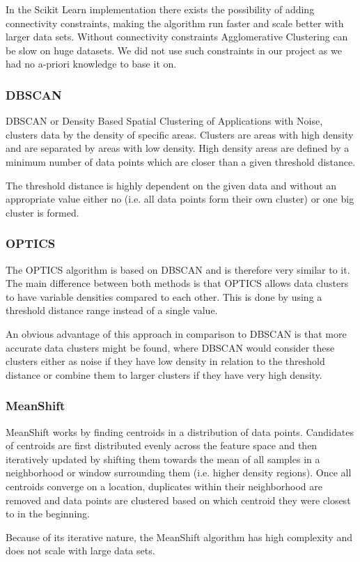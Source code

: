 In the Scikit Learn implementation there exists the possibility of adding connectivity constraints, making the algorithm run faster and scale better with larger data sets. Without connectivity constraints Agglomerative Clustering can be slow on huge datasets. We did not use such constraints in our project as we had no a-priori knowledge to base it on.

\subsubsection{DBSCAN}
DBSCAN or Density Based Spatial Clustering of Applications with Noise, clusters data by the density of specific areas. Clusters are areas with high density and are separated by areas with low density. High density areas are defined by a minimum number of data points which are closer than a given threshold distance.\cite{dbscan_paper}

The threshold distance is highly dependent on the given data and without an appropriate value either no (i.e. all data points form their own cluster) or one big cluster is formed.

\subsubsection{OPTICS}
The OPTICS algorithm is based on DBSCAN and is therefore very similar to it. The main difference between both methods is that OPTICS allows data clusters to have variable densities compared to each other. This is done by using a threshold distance range instead of a single value.\cite{optics_paper}

An obvious advantage of this approach in comparison to DBSCAN is that more accurate data clusters might be found, where DBSCAN would consider these clusters either as noise if they have low density in relation to the threshold distance or combine them to larger clusters if they have very high density.

\subsubsection{MeanShift}
MeanShift works by finding centroids in a distribution of data points. Candidates of centroids are first distributed evenly across the feature space and then iteratively updated by shifting them towards the mean of all samples in a neighborhood or window surrounding them (i.e. higher density regions). Once all centroids converge on a location, duplicates within their neighborhood are removed and data points are clustered based on which centroid they were closest to in the beginning.\cite{seif_2021}

Because of its iterative nature, the MeanShift algorithm has high complexity and does not scale with large data sets.
